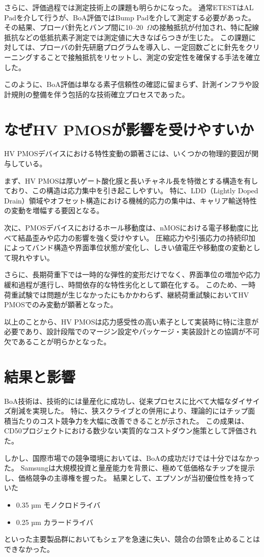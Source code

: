 \documentclass[conference]{IEEEtran}
\begin{document}
さらに、評価過程では測定技術上の課題も明らかになった。  
通常ETESTはAL Padを介して行うが、BoA評価ではBump Padを介して測定する必要があった。  
その結果、プローバ針先とバンプ間に10--20~$\Omega$の接触抵抗が付加され、特に配線抵抗などの低抵抗素子測定では測定値に大きなばらつきが生じた。  
この課題に対しては、プローバの針先研磨プログラムを導入し、一定回数ごとに針先をクリーニングすることで接触抵抗をリセットし、測定の安定性を確保する手法を確立した。  

このように、BoA評価は単なる素子信頼性の確認に留まらず、計測インフラや設計規則の整備を伴う包括的な技術確立プロセスであった。

\section{なぜHV PMOSが影響を受けやすいか}
HV PMOSデバイスにおける特性変動の顕著さには、いくつかの物理的要因が関与している。  

まず、HV PMOSは厚いゲート酸化膜と長いチャネル長を特徴とする構造を有しており、この構造は応力集中を引き起こしやすい。  
特に、LDD（Lightly Doped Drain）領域やオフセット構造における機械的応力の集中は、キャリア輸送特性の変動を増幅する要因となる。  

次に、PMOSデバイスにおけるホール移動度は、nMOSにおける電子移動度に比べて結晶歪みや応力の影響を強く受けやすい。  
圧縮応力や引張応力の持続印加によってバンド構造や界面準位状態が変化し、しきい値電圧や移動度の変動として現れやすい。  

さらに、長期荷重下では一時的な弾性的変形だけでなく、界面準位の増加や応力緩和過程が進行し、時間依存的な特性劣化として顕在化する。  
このため、一時荷重試験では問題が生じなかったにもかかわらず、継続荷重試験においてHV PMOSでのみ変動が顕著となった。  

以上のことから、HV PMOSは応力感受性の高い素子として実装時に特に注意が必要であり、設計段階でのマージン設定やパッケージ・実装設計との協調が不可欠であることが明らかとなった。

\section{結果と影響}
BoA技術は、技術的には量産化に成功し、従来プロセスに比べて大幅なダイサイズ削減を実現した。  
特に、狭スクライブとの併用により、理論的にはチップ面積当たりのコスト競争力を大幅に改善できることが示された。  
この成果は、CD50プロジェクトにおける数少ない実質的なコストダウン施策として評価された。

しかし、国際市場での競争環境においては、BoAの成功だけでは十分ではなかった。  
Samsungは大規模投資と量産能力を背景に、極めて低価格なチップを提示し、価格競争の主導権を握った。  
結果として、エプソンが当初優位性を持っていた
\begin{itemize}
  \item 0.35 µm モノクロドライバ
  \item 0.25 µm カラードライバ
\end{itemize}
といった主要製品群においてもシェアを急速に失い、競合の台頭を止めることはできなかった。
\end{document}
